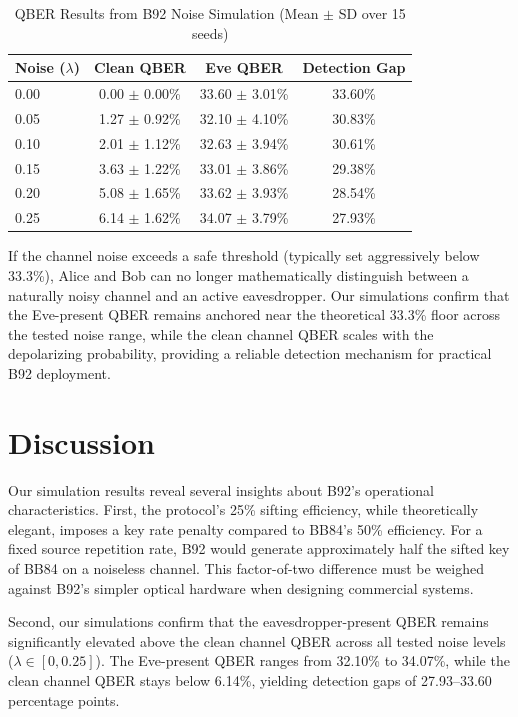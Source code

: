 \documentclass[conference]{IEEEtran}
\begin{document}
\begin{table}[htbp]
\caption{QBER Results from B92 Noise Simulation (Mean $\pm$ SD over 15 seeds)}
\label{tab:qber_results}
\centering
\small
\begin{tabular}{lccc}
\toprule
\textbf{Noise ($\lambda$)} & \textbf{Clean QBER} & \textbf{Eve QBER} & \textbf{Detection Gap} \\
\midrule
0.00 & 0.00 $\pm$ 0.00\% & 33.60 $\pm$ 3.01\% & 33.60\% \\
0.05 & 1.27 $\pm$ 0.92\% & 32.10 $\pm$ 4.10\% & 30.83\% \\
0.10 & 2.01 $\pm$ 1.12\% & 32.63 $\pm$ 3.94\% & 30.61\% \\
0.15 & 3.63 $\pm$ 1.22\% & 33.01 $\pm$ 3.86\% & 29.38\% \\
0.20 & 5.08 $\pm$ 1.65\% & 33.62 $\pm$ 3.93\% & 28.54\% \\
0.25 & 6.14 $\pm$ 1.62\% & 34.07 $\pm$ 3.79\% & 27.93\% \\
\bottomrule
\end{tabular}
\end{table}

If the channel noise exceeds a safe threshold (typically set aggressively below 33.3\%), Alice and Bob can no longer mathematically distinguish between a naturally noisy channel and an active eavesdropper. Our simulations confirm that the Eve-present QBER remains anchored near the theoretical 33.3\% floor across the tested noise range, while the clean channel QBER scales with the depolarizing probability, providing a reliable detection mechanism for practical B92 deployment.

\section{Discussion}\label{sec:discussion}
Our simulation results reveal several insights about B92's operational characteristics. First, the protocol's 25\% sifting efficiency, while theoretically elegant, imposes a key rate penalty compared to BB84's 50\% efficiency. For a fixed source repetition rate, B92 would generate approximately half the sifted key of BB84 on a noiseless channel. This factor-of-two difference must be weighed against B92's simpler optical hardware when designing commercial systems.

Second, our simulations confirm that the eavesdropper-present QBER remains significantly elevated above the clean channel QBER across all tested noise levels ($\lambda \in [0, 0.25]$). The Eve-present QBER ranges from 32.10\% to 34.07\%, while the clean channel QBER stays below 6.14\%, yielding detection gaps of 27.93--33.60 percentage points. %
\end{document}
